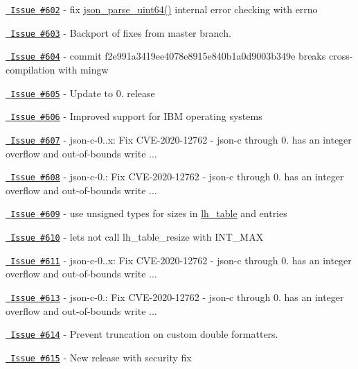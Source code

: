 \begin{DoxyItemize}
\item \href{https://github.com/json-c/json-c/issues/602}{\texttt{ Issue \#602}} -\/ fix \mbox{\hyperlink{json__util_8h_a94c2340c1344d57f7aa067f2dd0407f9}{json\+\_\+parse\+\_\+uint64()}} internal error checking with errno
\item \href{https://github.com/json-c/json-c/issues/603}{\texttt{ Issue \#603}} -\/ Backport of fixes from master branch.
\item \href{https://github.com/json-c/json-c/issues/604}{\texttt{ Issue \#604}} -\/ commit f2e991a3419ee4078e8915e840b1a0d9003b349e breaks cross-\/compilation with mingw
\item \href{https://github.com/json-c/json-c/issues/605}{\texttt{ Issue \#605}} -\/ Update to 0. release
\item \href{https://github.com/json-c/json-c/issues/606}{\texttt{ Issue \#606}} -\/ Improved support for IBM operating systems
\item \href{https://github.com/json-c/json-c/issues/607}{\texttt{ Issue \#607}} -\/ json-\/c-\/0..\+x\+: Fix CVE-\/2020-\/12762 -\/ json-\/c through 0. has an integer overflow and out-\/of-\/bounds write ...
\item \href{https://github.com/json-c/json-c/issues/608}{\texttt{ Issue \#608}} -\/ json-\/c-\/0.\+: Fix CVE-\/2020-\/12762 -\/ json-\/c through 0. has an integer overflow and out-\/of-\/bounds write ...
\item \href{https://github.com/json-c/json-c/issues/609}{\texttt{ Issue \#609}} -\/ use unsigned types for sizes in \mbox{\hyperlink{structlh__table}{lh\+\_\+table}} and entries
\item \href{https://github.com/json-c/json-c/issues/610}{\texttt{ Issue \#610}} -\/ let\textquotesingle{}s not call lh\+\_\+table\+\_\+resize with INT\+\_\+\+MAX
\item \href{https://github.com/json-c/json-c/issues/611}{\texttt{ Issue \#611}} -\/ json-\/c-\/0..\+x\+: Fix CVE-\/2020-\/12762 -\/ json-\/c through 0. has an integer overflow and out-\/of-\/bounds write ...
\item \href{https://github.com/json-c/json-c/issues/613}{\texttt{ Issue \#613}} -\/ json-\/c-\/0.\+: Fix CVE-\/2020-\/12762 -\/ json-\/c through 0. has an integer overflow and out-\/of-\/bounds write ...
\item \href{https://github.com/json-c/json-c/issues/614}{\texttt{ Issue \#614}} -\/ Prevent truncation on custom double formatters.
\item \href{https://github.com/json-c/json-c/issues/615}{\texttt{ Issue \#615}} -\/ New release with security fix

\end{DoxyItemize}
